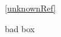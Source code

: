 \documentclass[12pt,a4paper]{article}
\begin{document}
\unknownCommand

\ref{unknownRef}


bad box
\\ \\ \\
\end{document}
